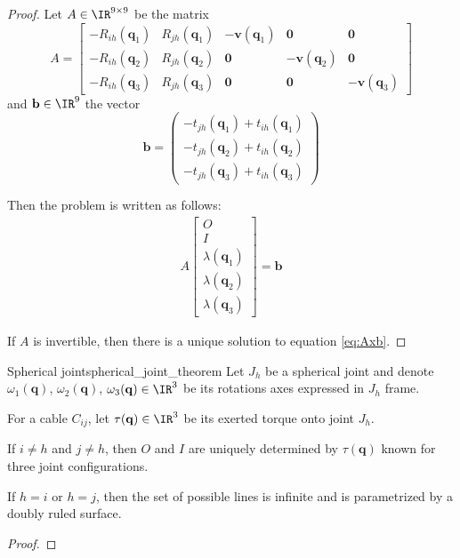\begin{proof}
    Let $A \in \IR^{9\times 9}$ be the matrix 
    $$A = \begin{bmatrix}
        - R_{ih}(\mathbf{q}_1) & R_{jh}(\mathbf{q}_1) & -\mathbf{v}(\mathbf{q}_1) & \mathbf{0} & \mathbf{0} \\
        - R_{ih}(\mathbf{q}_2) & R_{jh}(\mathbf{q}_2) & \mathbf{0} & -\mathbf{v}(\mathbf{q}_2) & \mathbf{0} \\
        - R_{ih}(\mathbf{q}_3) & R_{jh}(\mathbf{q}_3) & \mathbf{0} & \mathbf{0} & -\mathbf{v}(\mathbf{q}_3)
    \end{bmatrix}$$
    and $\mathbf{b}\in\IR^9$ the vector
    $$\mathbf{b} = \begin{pmatrix}
        -t_{jh}(\mathbf{q}_1) + t_{ih}(\mathbf{q}_1) \\
        -t_{jh}(\mathbf{q}_2) + t_{ih}(\mathbf{q}_2) \\
        -t_{jh}(\mathbf{q}_3) + t_{ih}(\mathbf{q}_3)
    \end{pmatrix}$$

    Then the problem is written as follows:
    \begin{align}
        \label{eq:Axb}
        A\begin{bmatrix}
            O \\ I \\ \lambda(\mathbf{q}_1) \\ \lambda(\mathbf{q}_2) \\ \lambda(\mathbf{q}_3)
        \end{bmatrix} = \mathbf{b}
    \end{align}

    If $A$ is invertible, then there is a unique solution to equation \ref{eq:Axb}.
\end{proof}


\begin{theorembox}{Spherical joint}{spherical_joint_theorem}
    Let $J_h$ be a spherical joint and denote $\omega_1(\mathbf{q})$, $\omega_2(\mathbf{q})$, $\omega_3(\mathbf{q})\in \IR^3$ be its rotations axes expressed in $J_h$ frame. 

    For a cable $C_{ij}$, let $\tau(\mathbf{q})\in\IR^3$ be its exerted torque onto joint $J_h$.

    If $i \neq h$ and $j \neq h$, then $O$ and $I$ are uniquely determined by $\tau(\mathbf{q})$ known for three joint configurations.

    If $h = i$ or $h = j$, then the set of possible lines is infinite and is parametrized by a doubly ruled surface.
\end{theorembox}
\begin{proof}
\end{proof}

